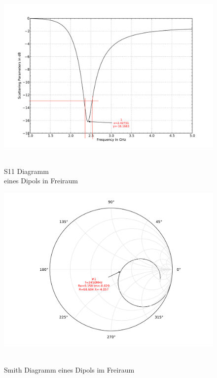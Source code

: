 \begin{figure}[!ht]
\begin{center}
  \includegraphics[width=\linewidth]{content/bilder/Evaluation/Dipol/S11DipolOhneABS.pdf}
  \caption{\\S11 Diagramm \\eines Dipols in Freiraum}\label{fig:S11_Dipol_freiraum_1}
\endminipage%
{}
  \includegraphics[width=\linewidth]{content/bilder/Evaluation/Dipol/SmithDipolOhneABS.pdf}
  \caption{\\Smith Diagramm eines Dipols im Freiraum}\label{fig:Smith_Dipol_freiraum_2}
\endminipage
\end{center}
\end{figure}

